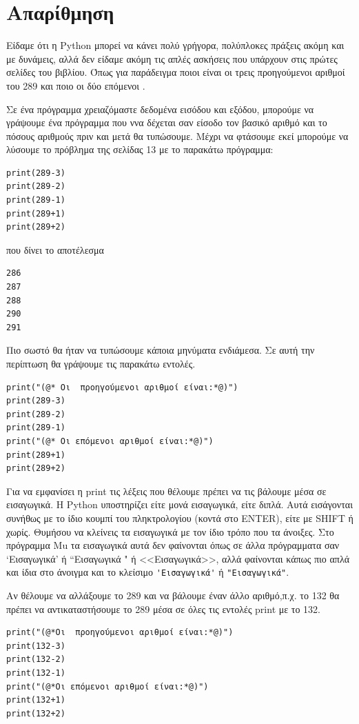 \documentclass[b5paper,11pt,twoside,openleft]{memoir}
\begin{document}
\section{Απαρίθμηση}
Είδαμε ότι η Python μπορεί να κάνει πολύ γρήγορα, πολύπλοκες πράξεις ακόμη και με δυνάμεις, αλλά δεν είδαμε ακόμη τις απλές ασκήσεις που υπάρχουν στις πρώτες σελίδες του βιβλίου. Όπως για παράδειγμα ποιοι είναι οι τρεις προηγούμενοι αριθμοί του 289 και ποιο οι δύο επόμενοι . 

Σε ένα πρόγραμμα χρειαζόμαστε δεδομένα εισόδου και εξόδου, μπορούμε να γράψουμε ένα πρόγραμμα που ννα δέχεται σαν είσοδο τον βασικό αριθμό
και το πόσους αριθμούς πριν και μετά θα τυπώσουμε. Μέχρι να φτάσουμε εκεί μπορούμε να λύσουμε το πρόβλημα της σελίδας 13 με το παρακάτω πρόγραμμα:
\begin{lstlisting}
print(289-3)
print(289-2)
print(289-1)
print(289+1)
print(289+2)
\end{lstlisting}
που δίνει το αποτέλεσμα
\begin{lstlisting}
286
287
288
290
291
\end{lstlisting}

Πιο σωστό θα ήταν να τυπώσουμε κάποια μηνύματα ενδιάμεσα. Σε αυτή την περίπτωση θα γράψουμε τις παρακάτω εντολές.
\begin{lstlisting}
print("(@* Οι  προηγούμενοι αριθμοί είναι:*@)")
print(289-3)
print(289-2)
print(289-1)
print("(@* Οι επόμενοι αριθμοί είναι:*@)")
print(289+1)
print(289+2)
\end{lstlisting}

Για να εμφανίσει η print τις λέξεις που θέλουμε πρέπει να τις βάλουμε μέσα σε εισαγωγικά. Η Python υποστηρίζει είτε μονά εισαγωγικά, είτε διπλά. Αυτά εισάγονται συνήθως με το ίδιο κουμπί του πληκτρολογίου (κοντά στο ENTER), είτε με SHIFT ή χωρίς. Θυμήσου να κλείνεις τα εισαγωγικά με τον ίδιο τρόπο που τα άνοιξες. Στο πρόγραμμα Mu τα εισαγωγικά αυτά δεν φαίνονται όπως σε άλλα πρόγραμματα σαν `Εισαγωγικά' ή ``Εισαγωγικά " ή <<Εισαγωγικά>>, αλλά φαίνονται κάπως πιο απλά και ίδια στο άνοιγμα και το κλείσιμο \lstinline{'Εισαγωγικά'} ή  \lstinline{"Εισαγωγικά"}. 

Αν θέλουμε να αλλάξουμε το 289 και να βάλουμε έναν άλλο αριθμό,π.χ. το 132 θα πρέπει να αντικαταστήσουμε το 289 μέσα σε όλες τις εντολές print με το 132.
\begin{lstlisting}
print("(@*Οι  προηγούμενοι αριθμοί είναι:*@)")
print(132-3)
print(132-2)
print(132-1)
print("(@*Οι επόμενοι αριθμοί είναι:*@)")
print(132+1)
print(132+2)
\end{lstlisting}
\end{document}
